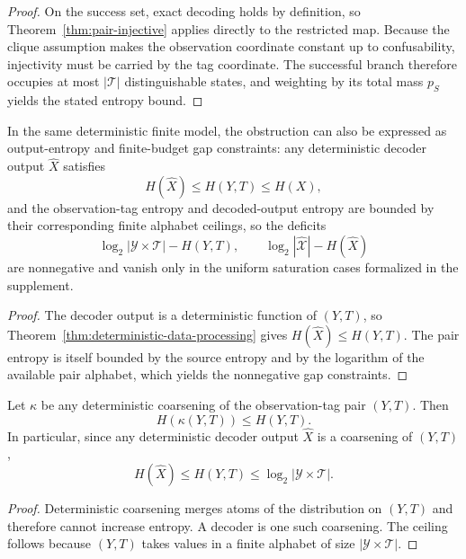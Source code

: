 \begin{proof}
On the success set, exact decoding holds by definition, so Theorem~\ref{thm:pair-injective} applies directly to the restricted map. Because the clique assumption makes the observation coordinate constant up to confusability, injectivity must be carried by the tag coordinate. The successful branch therefore occupies at most $|\mathcal T|$ distinguishable states, and weighting by its total mass $p_S$ yields the stated entropy bound.
\end{proof}

\begin{theorem}\label{thm:decoder-gap-converse}
In the same deterministic finite model, the obstruction can also be expressed as output-entropy and finite-budget gap constraints: any deterministic decoder output $\hat X$ satisfies
\[
H(\hat X)\le H(Y,T)\le H(X),
\]
and the observation-tag entropy and decoded-output entropy are bounded by their corresponding finite alphabet ceilings, so the deficits
\[
\log_2 |\mathcal Y\times \mathcal T|-H(Y,T),
\qquad
\log_2 |\widehat{\mathcal X}|-H(\hat X)
\]
are nonnegative and vanish only in the uniform saturation cases formalized in the supplement.
\end{theorem}

\begin{proof}
The decoder output is a deterministic function of $(Y,T)$, so Theorem~\ref{thm:deterministic-data-processing} gives $H(\hat X)\le H(Y,T)$. The pair entropy is itself bounded by the source entropy and by the logarithm of the available pair alphabet, which yields the nonnegative gap constraints.
\end{proof}

\begin{theorem}\label{thm:deterministic-data-processing}
Let $\kappa$ be any deterministic coarsening of the observation-tag pair $(Y,T)$. Then
\[
H(\kappa(Y,T)) \le H(Y,T).
\]
In particular, since any deterministic decoder output $\hat X$ is a coarsening of $(Y,T)$,
\[
H(\hat X)\le H(Y,T)\le \log_2 |\mathcal Y\times \mathcal T|.
\]
\end{theorem}

\begin{proof}
Deterministic coarsening merges atoms of the distribution on $(Y,T)$ and therefore cannot increase entropy. A decoder is one such coarsening. The ceiling follows because $(Y,T)$ takes values in a finite alphabet of size $|\mathcal Y\times\mathcal T|$.
\end{proof}

